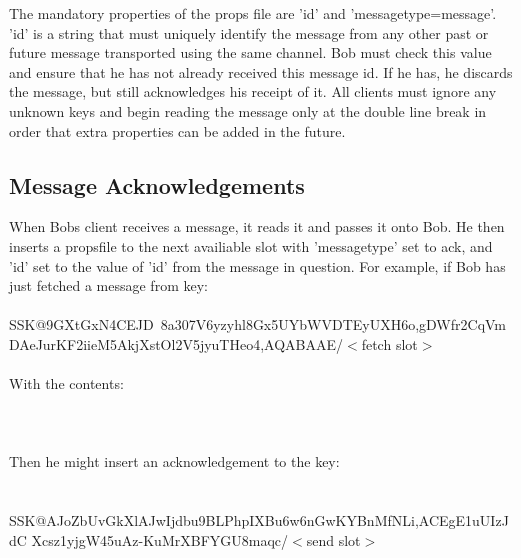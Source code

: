 \documentclass[12pt,a4paper]{article}
\begin{document}
The mandatory properties of the props file are 'id' and 'messagetype=message'. 'id' is a string that must
uniquely identify the message from any other past or future message transported using the same
channel. Bob must check this value and ensure that he has not already received this message id. If
he has, he discards the message, but still acknowledges his receipt of it. All clients must ignore
any unknown keys and begin reading the message only at the double line break in order that extra
properties can be added in the future.

\subsection{Message Acknowledgements}
When Bobs client receives a message, it reads it and passes it onto Bob. He then
inserts a propsfile to the next availiable slot with 'messagetype' set to ack, and 'id'
set to the value of 'id' from the message in question. For example, if Bob has just fetched a message
from key: \\
\\
SSK@9GXtGxN4CEJD~8a\-307V6yzyhl8Gx5U\-YbWVDTEyUXH6o,gDWfr2CqVm\-
DAeJurKF2iieM\-5AkjXstOl2V5j\-yuTHeo4,AQABAAE/$<$fetch slot$>$ \\
\\
With the contents: \\
\\

 \\
\\
Then he might insert an acknowledgement to the key: \\
\\
\\
SSK@AJoZbUvGkXlAJwI\-jdbu9BLPhpIXBu6\-w6nGwKYBnMfNLi,ACEgE1uUIzJdC\-
Xcsz1yjgW45u\-Az-KuMrXBFYG\-U8maqc/$<$send slot$>$ \\
\end{document}
